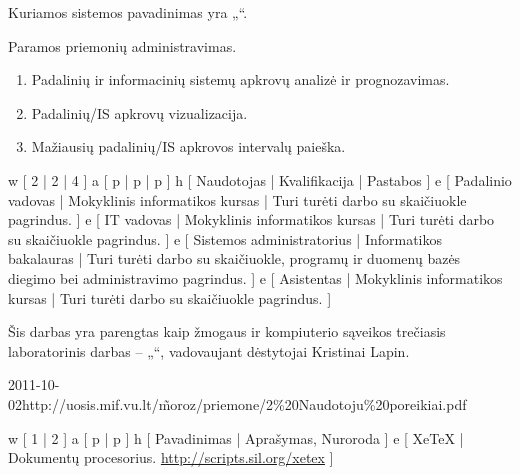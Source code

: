 Kuriamos sistemos pavadinimas yra „\systemname“.

Paramos priemonių administravimas.

\begin{enumerate}
  \item Padalinių ir informacinių sistemų apkrovų analizė ir prognozavimas.
  \item Padalinių/IS apkrovų vizualizacija.
  \item Mažiausių padalinių/IS apkrovos intervalų paieška.
\end{enumerate}

\xtable
{
  w [ 2 | 2 | 4 ]
  a [ p | p | p ]
  h [ Naudotojas | Kvalifikacija | Pastabos ]
  e [ Padalinio vadovas | Mokyklinis informatikos kursas
  | Turi turėti darbo su skaičiuokle pagrindus.
  ]
  e [ IT vadovas | Mokyklinis informatikos kursas
  | Turi turėti darbo su skaičiuokle pagrindus.
  ]
  e [ Sistemos administratorius | Informatikos bakalauras
  | Turi turėti darbo su skaičiuokle, programų ir duomenų bazės diegimo
  bei administravimo pagrindus.
  ]
  e [ Asistentas | Mokyklinis informatikos kursas
  | Turi turėti darbo su skaičiuokle pagrindus.
  ]
}

Šis darbas yra parengtas kaip žmogaus ir kompiuterio sąveikos
trečiasis laboratorinis darbas – „\docname“, vadovaujant
dėstytojai Kristinai Lapin.

\xdoclist
{
  {2011-10-02}{http://uosis.mif.vu.lt/\~moroz/priemone/2\%20Naudotoju\%20poreikiai.pdf}
}

\xtableu
{
  w [ 1 | 2 ]
  a [ p | p ]
  h [ Pavadinimas | Aprašymas, Nuroroda ]
  e [ XeTeX | Dokumentų procesorius. \newline \url{http://scripts.sil.org/xetex} ]
}
